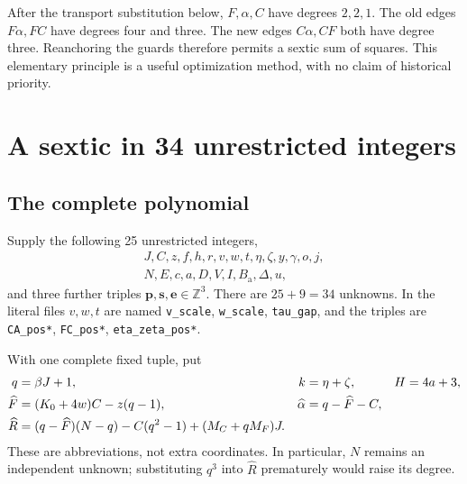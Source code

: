 \documentclass[11pt,a4paper]{article}
\theoremstyle{definition}
\newcommand{\Z}{\mathbb Z}
\newcommand{\MC}{M_C}
\newcommand{\MF}{M_F}
\newcommand{\Baux}{B_{\mathrm a}}
\newcommand{\src}[1]{{\urlstyle{tt}\nolinkurl{#1}}}
\begin{document}
After the transport substitution below, \(F,\alpha,C\) have
degrees \(2,2,1\). The old edges \(F\alpha,FC\) have degrees
four and three. The new edges \(C\alpha,CF\) both have degree
three. Reanchoring the guards therefore permits a sextic sum
of squares. This elementary principle is a useful optimization
method, with no claim of historical priority.

\section{A sextic in 34 unrestricted integers}
\label{sec:s34}

\subsection{The complete polynomial}

Supply the following 25 unrestricted integers,
\[
\begin{gathered}
 J,C,z,f,h,r,v,w,t,\eta,\zeta,y,\gamma,o,j,\\
 N,E,c,a,D,V,I,\Baux,\Delta,u,
\end{gathered}
\]
and three further triples \(\mathbf p,\mathbf s,\mathbf e\in\Z^3\).
There are \(25+9=34\) unknowns. In the literal files \(v,w,t\)
are named \src{v_scale}, \src{w_scale}, \src{tau_gap}, and the
triples are \src{CA_pos*}, \src{FC_pos*}, \src{eta_zeta_pos*}.

With one complete fixed tuple, put
\begin{align}
 q&=\beta J+1,&k&=\eta+\zeta,&H&=4a+3, \notag\\
 \widehat F&=(K_0+4w)C-z(q-1),&
 \widehat\alpha&=q-\widehat F-C, \notag\\
 \widehat R&=(q-\widehat F)(N-q)-C(q^2-1)
                         +(\MC+q\MF)J.          \label{eq:s34abbr}
\end{align}
These are abbreviations, not extra coordinates. In particular,
\(N\) remains an independent unknown; substituting \(q^3\) into
\(\widehat R\) prematurely would raise its degree.
\end{document}
